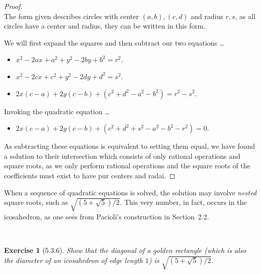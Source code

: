 \documentclass[12pt]{article}
\newcommand{\XB}{\color{black}}
\newcommand{\XBB}{\color{blue}}
\newcommand{\ds}{\displaystyle}
\theoremstyle{plain}
\newtheorem{ex}{Exercise}
\begin{document}
\begin{proof}
  \ \\

  The form given describes circles with center $ (a, b), (c, d) $ and radius $ r, s $, as all circles have a center and radius, they can be written in this form.

  We will first expand the squares and then subtract our two equations \dots

  \begin{itemize}
    \item $ \ds x^{2} - 2ax + a^{2} + y^{2} - 2by + b^{2} = r^{2} $.
    \item $ \ds x^{2} - 2cx + c^{2} + y^{2} - 2dy + d^{2} = s^{2} $.
    \item $ \ds 2x(c - a) + 2y(c - b) + (c^{2} + d^{2} - a^{2} - b^{2}) = r^{2} - s^{2} $.
  \end{itemize}

  Invoking the quadratic equation \dots

  \begin{itemize}
    \item $ \ds 2x(c - a) + 2y(c - b) + (c^{2} + d^{2} + s^{2} - a^{2} - b^{2} - r^{2}) = 0 $.
  \end{itemize}

  As subtracting these equations is equivalent to setting them equal, we have found a solution to their intersection which consists of only rational operations and square roots,
  as we only perform rational operations and the square roots of the coefficients must exist to have pur centers and radai.

\end{proof}

\newpage

When a sequence of quadratic equations is solved, the solution may involve \emph{nested} square roots, such as $ \sqrt{(5 + \sqrt{5}) / 2} $. This very number, in fact, occurs in the icosahedron, as one sees from Pacioli's construction in Section~2.2.

\XBB\hrulefill\XB \\
\begin{ex} [5.3.6]
  Show that the diagonal of a golden rectangle (which is also the diameter of an icosahedron of edge length $ 1 $) is $ \sqrt{(5 + \sqrt{5}) / 2} $.
\end{ex}
\XBB\hrulefill\XB \\
\end{document}
